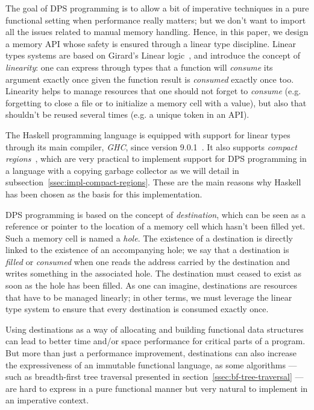 \documentclass[english]{jflart}
\begin{document}
The goal of DPS programming is to allow a bit of imperative techniques in a pure functional setting when performance really matters; but we don't want to import all the issues related to manual memory handling. Hence, in this paper, we design a memory API whose safety is ensured through a linear type discipline. Linear types systems are based on Girard's Linear logic~\cite{girard_linear_1995}, and introduce the concept of \emph{linearity}: one can express through types that a function will \emph{consume} its argument exactly once given the function result is \emph{consumed} exactly once too. Linearity helps to manage resources that one should not forget to \emph{consume} (e.g. forgetting to close a file or to initialize a memory cell with a value), but also that shouldn't be reused several times (e.g. a unique token in an API).

The Haskell programming language is equipped with support for linear types through its main compiler, \emph{GHC}, since version 9.0.1~\cite{bernardy_linear_2018}. It also supports \emph{compact regions}~\cite{yang_efficient_2015}, which are very practical to implement support for DPS programming in a language with a copying garbage collector as we will detail in subsection~\ref{ssec:impl-compact-regions}. These are the main reasons why Haskell has been chosen as the basis for this implementation.

DPS programming is based on the concept of \emph{destination}, which can be seen as a reference or pointer to the location of a memory cell which hasn't been filled yet. Such a memory cell is named a \emph{hole}. The existence of a destination is directly linked to the existence of an accompanying hole; we say that a destination is \emph{filled} or \emph{consumed} when one reads the address carried by the destination and writes something in the associated hole. The destination must ceased to exist as soon as the hole has been filled. As one can imagine, destinations are resources that have to be managed linearly; in other terms, we must leverage the linear type system to ensure that every destination is consumed exactly once.

Using destinations as a way of allocating and building functional data structures can lead to better time and/or space performance for critical parts of a program. But more than just a performance improvement, destinations can also increase the expressiveness of an immutable functional language, as some algorithms --- such as breadth-first tree traversal presented in section~\ref{ssec:bf-tree-traversal} --- are hard to express in a pure functional manner but very natural to implement in an imperative context.
\end{document}
